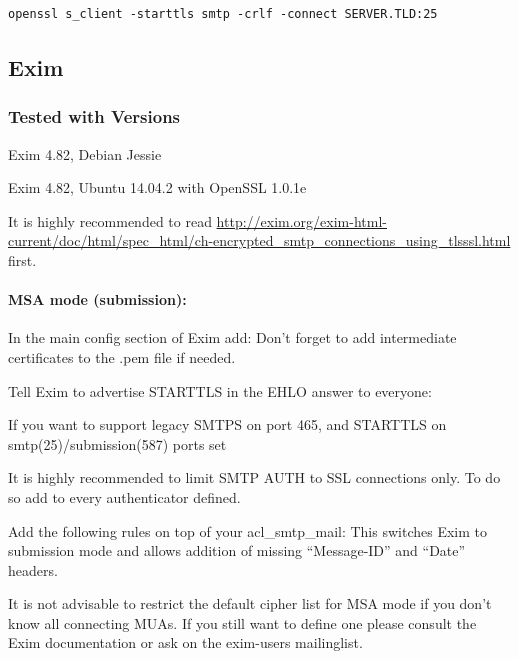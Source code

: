 \begin{lstlisting}
openssl s_client -starttls smtp -crlf -connect SERVER.TLD:25
\end{lstlisting}


\subsection{Exim}

\subsubsection{Tested with Versions}
\begin{itemize*}
  \item Exim 4.82, Debian Jessie
  \item Exim 4.82, Ubuntu 14.04.2 with OpenSSL 1.0.1e
\end{itemize*}


It is highly recommended to read
\url{http://exim.org/exim-html-current/doc/html/spec_html/ch-encrypted_smtp_connections_using_tlsssl.html}
first.

\paragraph{MSA mode (submission):}
In the main config section of Exim add:
Don't forget to add intermediate certificates to the .pem file if needed.

Tell Exim to advertise STARTTLS in the EHLO answer to everyone:

If you want to support legacy SMTPS on port 465, and STARTTLS on smtp(25)/submission(587) ports set

It is highly recommended to limit SMTP AUTH to SSL connections only. To do so add
to every authenticator defined.

Add the following rules on top of your acl\_smtp\_mail:
This switches Exim to submission mode and allows addition of missing ``Message-ID'' and ``Date'' headers.

It is not advisable to restrict the default cipher list for MSA mode if you don't know all connecting MUAs. If you still want to define one please consult the Exim documentation or ask on the exim-users mailinglist.

